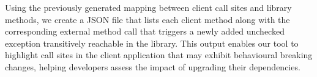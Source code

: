 Using the previously generated mapping between client call sites and library methods, we create a JSON file that lists each client method along with the corresponding external method call that triggers a newly added unchecked exception transitively reachable in the library. This output enables our tool to highlight call sites in the client application that may exhibit behavioural breaking changes, helping developers assess the impact of upgrading their dependencies.
